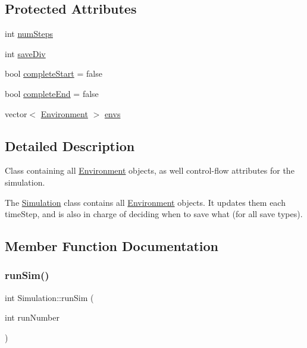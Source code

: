 \subsection*{Protected Attributes}
\begin{DoxyCompactItemize}
\item 
int \hyperlink{classSimulation_a999ce13c1a3d4dca2bf92e346d8b709f}{num\+Steps}
\item 
int \hyperlink{classSimulation_ae8f095e92da49a648954416b351e27c8}{save\+Div}
\item 
bool \hyperlink{classSimulation_a84cd73f44cff4fdbbb40fb98b49f8026}{complete\+Start} = false
\item 
bool \hyperlink{classSimulation_a17bcf189d0f10fa47e4b2dc4b53d4939}{complete\+End} = false
\item 
vector$<$ \hyperlink{classEnvironment}{Environment} $>$ \hyperlink{classSimulation_a29309017ca18043de245ef843b56c533}{envs}
\end{DoxyCompactItemize}


\subsection{Detailed Description}
Class containing all \hyperlink{classEnvironment}{Environment} objects, as well control-\/flow attributes for the simulation. 

The \hyperlink{classSimulation}{Simulation} class contains all \hyperlink{classEnvironment}{Environment} objects. It updates them each time\+Step, and is also in charge of deciding when to save what (for all save types). 

\subsection{Member Function Documentation}
\hypertarget{classSimulation_a7eb16da89581b496d33b77efbb63b9cd}{}\label{classSimulation_a7eb16da89581b496d33b77efbb63b9cd} 
\subsubsection{\texorpdfstring{run\+Sim()}{runSim()}}
{\footnotesize\ttfamily int Simulation\+::run\+Sim (\begin{DoxyParamCaption}\item[{int}]{run\+Number }\end{DoxyParamCaption})\hspace{0.3cm}{\ttfamily [virtual]}}



